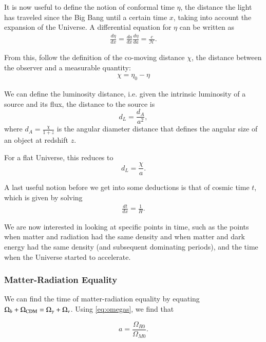 \documentclass{aa}
\begin{document}
It is now useful to define the notion of conformal time $\eta$, the distance the light has traveled since the Big Bang until a certain time $x$, taking into account the expansion of the Universe. A differential equation for $\eta$ can be written as
\begin{align}
\frac{d\eta}{dx} = \frac{da}{dx}\frac{d\eta}{da} = \frac{c}{\mathcal{H}}.
\end{align}

From this, follow the definition of the co-moving distance $\chi$, the distance between the observer and a measurable quantity:
\begin{align}
\chi = \eta_0 - \eta
\end{align}

We can define the luminosity distance, i.e. given the intrinsic luminosity of a source and its flux, the distance to the source is
\begin{equation}
d_L = \frac{d_A}{a^2},
\end{equation}
where $d_A = \frac{\chi}{1+z}$ is the angular diameter distance that defines the angular size of an object at redshift $z$.

For a flat Universe, this reduces to
\begin{equation}
    d_L = \frac{\chi}{a}.
\end{equation}

A last useful notion before we get into some deductions is that of cosmic time $t$, which is given by solving
\begin{align}
\label{eq:t-ode}
\frac{dt}{dx} = \frac{1}{H}.
\end{align}

We are now interested in looking at specific points in time, such as the points when matter and radiation had the same density and when matter and dark energy had the same density (and subsequent dominating periods), and the time when the Universe started to accelerate.

\subsubsection{Matter-Radiation Equality}

We can find the time of matter-radiation equality by equating $
\Omega_b + \Omega_{\rm CDM} = \Omega_\gamma + \Omega_{\nu}$. Using \eqref{eq:omegas}, we find that

\begin{equation}
    a = \frac{\Omega_{R0}}{\Omega_{M0}}.
\end{equation}
\end{document}
